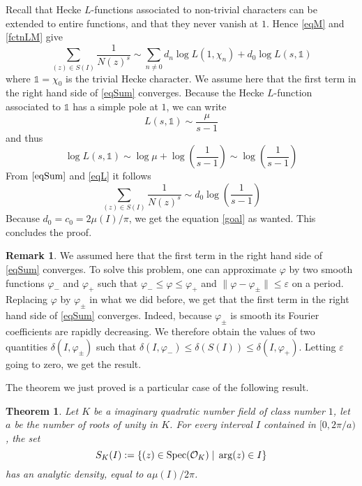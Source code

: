 \documentclass[12pt,a4paper,english]{article}
\theoremstyle{plain}
\newtheorem*{thm}{Theorem}
\theoremstyle{definition}
\newtheorem*{rem}{Remark}
\DeclareMathOperator{\Spec}{\normalfont{Spec}}
\begin{document}
Recall that Hecke $L$-functions associated to non-trivial characters can be extended to entire functions, and that they never vanish at $1$. Hence \eqref{eqM} and \eqref{fctnLM} give
\begin{equation}\label{eqSum}
    \sum_{(z)\in S(I)}\frac{1}{N(z)^s}\sim \sum_{n\neq 0}d_n \log L(1,\chi_n)+d_0\log L(s,\mathds{1})
\end{equation}
where $\mathds{1}=\chi_0$ is the trivial Hecke character. We assume here that the first term in the right hand side of \eqref{eqSum} converges. Because the Hecke $L$-function associated to $\mathds{1}$ has a simple pole at $1$, we can write
\begin{equation*}
    L(s,\mathds{1})\sim \frac{\mu}{s-1}
\end{equation*}
and thus
\begin{equation}\label{eqL}
    \log L(s,\mathds{1})\sim \log\mu+\log\left(\frac{1}{s-1}\right)\sim \log\left(\frac{1}{s-1}\right)
\end{equation}
From $\eqref{eqSum}$ and \eqref{eqL} it follows
\begin{equation*}
    \sum_{(z)\in S(I)}\frac{1}{N(z)^s}\sim d_0\log\left(\frac{1}{s-1}\right)
\end{equation*}
Because $d_0=c_0=2\mu(I)/\pi$, we get the equation \eqref{goal} as wanted. This concludes the proof.
\vspace{0.5cm}

\begin{rem}
We assumed here that the first term in the right hand side of \eqref{eqSum} converges. To solve this problem, one can approximate $\varphi$ by two smooth functions $\varphi_-$ and $\varphi_+$ such that $\varphi_-\leqslant \varphi\leqslant\varphi_+$ and $\|\varphi-\varphi_\pm\|\leqslant\varepsilon$ on a period. Replacing $\varphi$ by $\varphi_\pm$ in what we did before, we get that the first term in the right hand side of \eqref{eqSum} converges. Indeed, because $\varphi_\pm$ is smooth its Fourier coefficients are rapidly decreasing. We therefore obtain the values of two quantities $\delta(I,\varphi_\pm)$ such that $\delta(I,\varphi_-)\leqslant\delta(S(I))\leqslant\delta(I,\varphi_+)$. Letting $\varepsilon$ going to zero, we get the result.
\end{rem}
\vspace{1cm}

The theorem we just proved is a particular case of the following result.

\begin{thm}
Let $K$ be a imaginary quadratic number field of class number $1$, let $a$ be the number of roots of unity in $K$. For every interval $I$ contained in $[0,2\pi/a)$, the set
\begin{equation*}
    S_K(I):=\{(z)\in\Spec(\mathcal{O}_K)\mid\, \arg(z)\in I\}
\end{equation*}
has an analytic density, equal to $a\mu(I)/2\pi$.
\end{thm}
\end{document}

